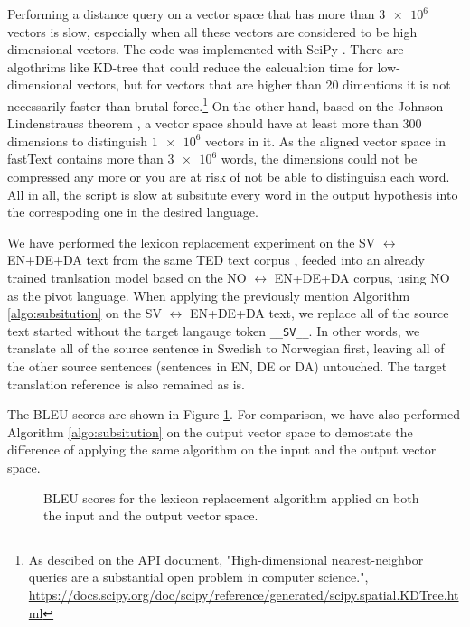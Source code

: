 \documentclass[thesis,fonts=libertine]{cluu}
\begin{document}
Performing a distance query on a vector space that has more than $\num{3e6}$ vectors is slow, especially when all these vectors are considered to be high dimensional vectors. The code was implemented with SciPy \parencite{Virtanen:2019aa}. There are algothrims like KD-tree \parencite{Maneewongvatana:aa} that could reduce the calcualtion time for low-dimensional vectors, but for vectors that are higher than 20 dimentions it is not necessarily faster than brutal force.\footnote{As descibed on the API document, "High-dimensional nearest-neighbor queries are a substantial open problem in computer science.", \url{https://docs.scipy.org/doc/scipy/reference/generated/scipy.spatial.KDTree.html}} On the other hand, based on the Johnson–Lindenstrauss theorem \parencite{johnson1984extensions}, a vector space should have at least more than 300 dimensions to distinguish $\num{1e6}$ vectors in it. As the aligned vector space in fastText contains more than $\num{3e6}$ words, the dimensions could not be compressed any more or you are at risk of not be able to distinguish each word. All in all, the script is slow at subsitute every word in the output hypothesis into the correspoding one in the desired language.

We have performed the lexicon replacement experiment on the SV $\leftrightarrow$ EN+DE+DA text from the same TED text corpus \parencite{Qi:2018aa}, feeded into an already trained tranlsation model based on the NO $\leftrightarrow$ EN+DE+DA corpus, using NO as the pivot language. When applying the previously mention Algorithm \ref{algo:subsitution} on the SV $\leftrightarrow$ EN+DE+DA text, we replace all of the source text started without the target langauge token \verb|__SV__|. In other words, we translate all of the source sentence in Swedish to Norwegian first, leaving all of the other source sentences (sentences in EN, DE or DA) untouched. The target translation reference is also remained as is. 

The BLEU scores are shown in Figure \ref{fig:target_replacement}. For comparison, we have also performed Algorithm \ref{algo:subsitution} on the output vector space to demostate the difference of applying the same algorithm on the input and the output vector space.

\begin{figure}
  \centering
  \caption{BLEU scores for the lexicon replacement algorithm applied on both the input and the output vector space.}
  \label{fig:target_replacement}
\end{figure}
\end{document}
